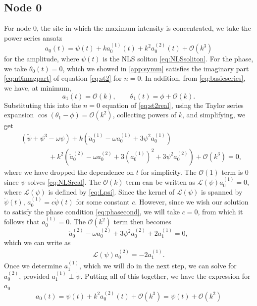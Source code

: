 \documentclass[11pt,reqno]{amsart}
\def\calL{{\mathcal L}}
\begin{document}
\subsection{Node 0}

For node 0, the site in which the maximum intensity is concentrated, we take the power series ansatz 
\[
a_0(t) = \psi(t) + k a_0^{(1)}(t) + k^2 a_0^{(2)}(t) + \mathcal{O}(k^3)
\]
for the amplitude, where $\psi(t)$ is the NLS soliton \cref{eq:NLSsoliton}. For the phase, we take $\theta_0(t) = 0$, which we showed in \cref{app:symm} satisfies the imaginary part \cref{eq:n0imagpart} of equation \cref{eq:st2} for $n=0$. In addition, from \cref{eq:basicseries}, we have, at minimum, 
\[
a_1(t) = \mathcal{O}(k), \qquad \theta_1(t) = \phi + \mathcal{O}(k).
\]
Substituting this into the $n=0$ equation of \cref{eq:st2real}, using the Taylor series expansion $\cos(\theta_1-\phi) = \mathcal{O}(k^2)$, collecting powers of $k$, and simplifying, we get
\begin{equation*}
\begin{aligned}
&\left(\ddot{\psi} + \psi^3 - \omega \psi\right) 
+ k\left(\ddot a_0^{(1)} - \omega a_0^{(1)} + 3 \psi^2 a_0^{(1)}\right) \\
&\qquad\qquad+ k^2\left(\ddot a_0^{(2)} - \omega a_0^{(2)} + 3\left(a_0^{(1)}\right)^2 + 3 \psi^2 a_0^{(2)}\right) + \mathcal{O}(k^3) = 0,
\end{aligned}
\end{equation*}
where we have dropped the dependence on $t$ for simplicity. The $\mathcal{O}(1)$ term is 0 since $\psi$ solves \cref{eq:NLSreal}. The $\mathcal{O}(k)$ term can be written as $\calL(\psi)a_0^{(1)}=0$, where $\calL(\psi)$ is defined by \cref{eq:Lpsi}. Since the kernel of $\calL(\psi)$ is spanned by $\dot \psi(t)$, $a_0^{(1)} = c \dot \psi(t)$ for some constant $c$. However, since we wish our solution to satisfy the phase condition \cref{eq:phasecond}, we will take $c = 0$, from which it follows that $a_0^{(1)} = 0$. The $\mathcal{O}(k^2)$ term then becomes
\[
\ddot a_0^{(2)} - \omega a_0^{(2)} + 3 \psi^2 a_0^{(2)} + 2 a_1^{(1)} = 0, 
\]
which we can write as 
\begin{align}\label{eq:solvea0ta}
\calL(\psi) a_0^{(2)} = -2 a_1^{(1)}.
\end{align}
Once we determine $a_1^{(1)}$, which we will do in the next step, we can solve for $a_0^{(2)}$, provided $a_1^{(1)} \perp \dot\psi$. Putting all of this together, we have the expression for $a_0$
\begin{equation}\label{eq:a0eq}
a_0(t) = \psi(t) + k^2 a_0^{(2)}(t) + \mathcal{O}(k^3) = \psi(t) + \mathcal{O}(k^2)
\end{equation}
\end{document}
